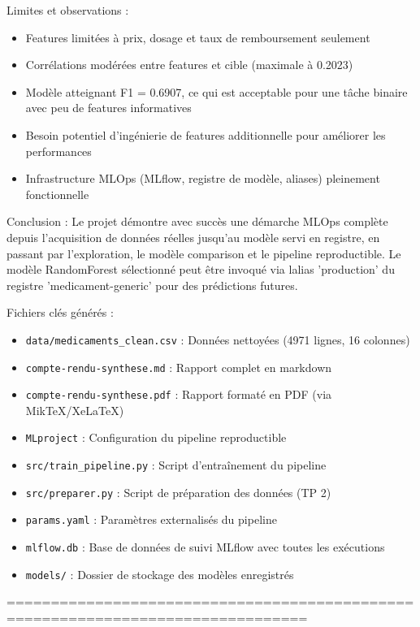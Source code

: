 \documentclass[12pt,a4paper]{report}
\begin{document}
Limites et observations :
\begin{itemize}
    \item Features limitées à prix, dosage et taux de remboursement seulement
    \item Corrélations modérées entre features et cible (maximale à 0.2023)
    \item Modèle atteignant F1 = 0.6907, ce qui est acceptable pour une tâche binaire avec peu de features informatives
    \item Besoin potentiel d'ingénierie de features additionnelle pour améliorer les performances
    \item Infrastructure MLOps (MLflow, registre de modèle, aliases) pleinement fonctionnelle
\end{itemize}

Conclusion :
Le projet démontre avec succès une démarche MLOps complète depuis l'acquisition de données réelles jusqu'au modèle servi en registre, en passant par l'exploration, le modèle comparison et le pipeline reproductible. Le modèle RandomForest sélectionné peut être invoqué via lalias 'production' du registre 'medicament-generic' pour des prédictions futures.

Fichiers clés générés :
\begin{itemize}
    \item \texttt{data/medicaments\_clean.csv} : Données nettoyées (4971 lignes, 16 colonnes)
    \item \texttt{compte-rendu-synthese.md} : Rapport complet en markdown
    \item \texttt{compte-rendu-synthese.pdf} : Rapport formaté en PDF (via MikTeX/XeLaTeX)
    \item \texttt{MLproject} : Configuration du pipeline reproductible
    \item \texttt{src/train\_pipeline.py} : Script d'entraînement du pipeline
    \item \texttt{src/preparer.py} : Script de préparation des données (TP 2)
    \item \texttt{params.yaml} : Paramètres externalisés du pipeline
    \item \texttt{mlflow.db} : Base de données de suivi MLflow avec toutes les exécutions
    \item \texttt{models/} : Dossier de stockage des modèles enregistrés
\end{itemize}

================================================================================
\end{document}
